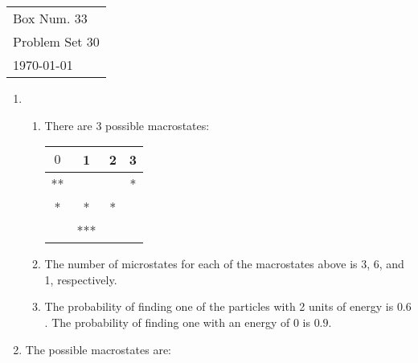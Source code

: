 \documentclass[10pt]{article}
\begin{document}
  \begin{tabular}{l}
    Box Num. 33 \\
    Problem Set 30 \\
    \today
  \end{tabular}

  \begin{enumerate}
    \item \begin{enumerate}
        \item There are 3 possible macrostates:

        \begin{tabular}{cccc}
            \hline \hline
            $0$ & 1 & 2 & 3 \\ \hline
            ** & & & * \\
            * & * & * & \\
            & *** & & \\ \hline \hline
        \end{tabular}

        \item The number of microstates for each of the macrostates above is 3, 6, and 1, respectively.

        \item The probability of finding one of the particles with 2 units of energy is $0.6$. The probability of finding one with an energy of 0 is $0.9$.
    \end{enumerate}

    \item The possible macrostates are:


\end{enumerate}
\end{document}

